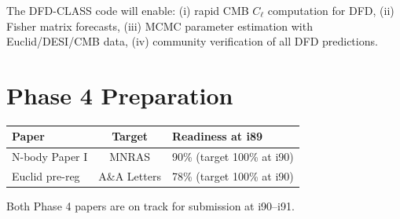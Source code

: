 \documentclass[11pt,a4paper]{article}
\begin{document}
The DFD-CLASS code will enable: (i) rapid CMB $C_\ell$ computation for DFD, (ii) Fisher matrix forecasts, (iii) MCMC parameter estimation with Euclid/DESI/CMB data, (iv) community verification of all DFD predictions.

\section{Phase 4 Preparation}

\begin{center}
\begin{tabular}{lcl}
\toprule
\textbf{Paper} & \textbf{Target} & \textbf{Readiness at i89} \\
\midrule
N-body Paper I & MNRAS & 90\% (target 100\% at i90) \\
Euclid pre-reg & A\&A Letters & 78\% (target 100\% at i90) \\
\bottomrule
\end{tabular}
\end{center}

Both Phase 4 papers are on track for submission at i90--i91.
\end{document}
